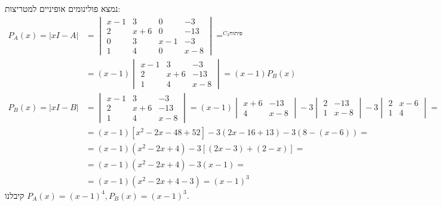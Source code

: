 \documentclass{article}
\DeclareMathOperator*{\equals}{=}
\begin{document}
נמצא פולינומים אופיניים למטריצות:
\begin{align*}
    P_A(x)=|xI-A| & =\begin{vmatrix}
                         x-1 & 3   & 0   & -3  \\
                         2   & x+6 & 0   & -13 \\
                         0   & 3   & x-1 & -3  \\
                         1   & 4   & 0   & x-8
                     \end{vmatrix}\equals^{C_3 \text{פיתוח }}                        \\
                  & = (x-1)\begin{vmatrix}
                               x-1 & 3   & -3  \\
                               2   & x+6 & -13 \\
                               1   & 4   & x-8
                           \end{vmatrix}=(x-1)P_B(x)                                 \\
    P_B(x)=|xI-B| & =\begin{vmatrix}
                         x-1 & 3   & -3  \\
                         2   & x+6 & -13 \\
                         1   & 4   & x-8
                     \end{vmatrix}=(x-1)\begin{vmatrix}
                                            x+6 & -13 \\
                                            4   & x-8
                                        \end{vmatrix}-3\begin{vmatrix}
                                                           2 & -13 \\
                                                           1 & x-8
                                                       \end{vmatrix}-3\begin{vmatrix}
                                                                          2 & x-6 \\
                                                                          1 & 4
                                                                      \end{vmatrix}= \\
                  & =(x-1)[x^2-2x-48+52]-3(2x-16+13)-3(8-(x-6))=                     \\
                  & = (x-1)(x^2-2x+4) -3[(2x-3)+(2-x)]=                              \\
                  & = (x-1)(x^2-2x+4) -3(x-1)=                                       \\
                  & = (x-1)(x^2-2x+4-3)=(x-1)^3
\end{align*}
קיבלנו $P_A(x)=(x-1)^4, P_B(x)=(x-1)^3$.
\end{document}
